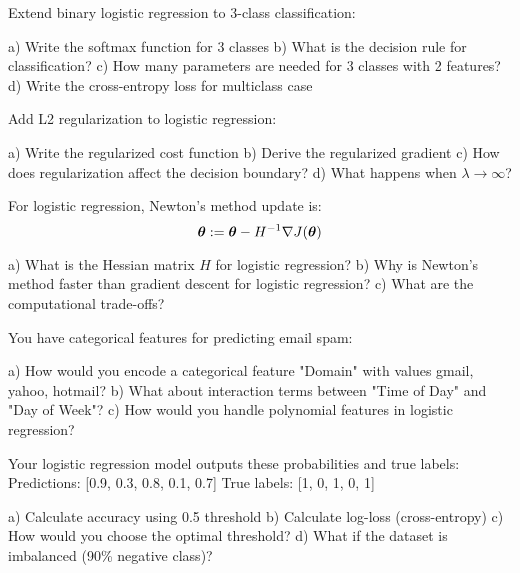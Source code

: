 \documentclass{article}
\newcounter{exercise}
\begin{document}
\begin{tcolorbox}[colback=gray!5!white,colframe=gray!75!black,title=Problem \stepcounter{exercise}: Multiclass Extension]

Extend binary logistic regression to 3-class classification:

a) Write the softmax function for 3 classes
b) What is the decision rule for classification?
c) How many parameters are needed for 3 classes with 2 features?
d) Write the cross-entropy loss for multiclass case
\end{tcolorbox}

\begin{tcolorbox}[colback=gray!5!white,colframe=gray!75!black,title=Problem \stepcounter{exercise}: Regularization]

Add L2 regularization to logistic regression:

a) Write the regularized cost function
b) Derive the regularized gradient
c) How does regularization affect the decision boundary?
d) What happens when $\lambda \to \infty$?
\end{tcolorbox}

\begin{tcolorbox}[colback=gray!5!white,colframe=gray!75!black,title=Problem \stepcounter{exercise}: Newton's Method]

For logistic regression, Newton's method update is:
$$\boldsymbol{\theta} := \boldsymbol{\theta} - H^{-1} \nabla J(\boldsymbol{\theta})$$

a) What is the Hessian matrix $H$ for logistic regression?
b) Why is Newton's method faster than gradient descent for logistic regression?
c) What are the computational trade-offs?
\end{tcolorbox}

\begin{tcolorbox}[colback=gray!5!white,colframe=gray!75!black,title=Problem \stepcounter{exercise}: Feature Engineering]

You have categorical features for predicting email spam:

a) How would you encode a categorical feature "Domain" with values {gmail, yahoo, hotmail}?
b) What about interaction terms between "Time of Day" and "Day of Week"?
c) How would you handle polynomial features in logistic regression?
\end{tcolorbox}

\begin{tcolorbox}[colback=gray!5!white,colframe=gray!75!black,title=Problem \stepcounter{exercise}: Model Evaluation]

Your logistic regression model outputs these probabilities and true labels:
Predictions: [0.9, 0.3, 0.8, 0.1, 0.7]
True labels: [1, 0, 1, 0, 1]

a) Calculate accuracy using 0.5 threshold
b) Calculate log-loss (cross-entropy)
c) How would you choose the optimal threshold?
d) What if the dataset is imbalanced (90\% negative class)?
\end{tcolorbox}
\end{document}

